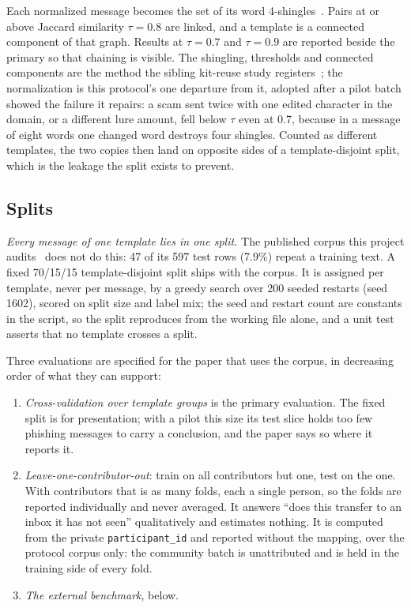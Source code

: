 Each normalized message becomes the set of its word 4-shingles~\cite{broder_sms}. Pairs at or
above Jaccard similarity $\tau = 0.8$ are linked, and a template is a connected component of
that graph. Results at $\tau = 0.7$ and $\tau = 0.9$ are reported beside the primary so that
chaining is visible. The shingling, thresholds and connected components are the method the
sibling kit-reuse study registers~\cite{kitreuse_sms}; the normalization is this protocol's one
departure from it, adopted after a pilot batch showed the failure it repairs: a scam sent twice
with one edited character in the domain, or a different lure amount, fell below $\tau$ even at
0.7, because in a message of eight words one changed word destroys four shingles. Counted as
different templates, the two copies then land on opposite sides of a template-disjoint split,
which is the leakage the split exists to prevent.

\subsection*{Splits}
\emph{Every message of one template lies in one split.} The published corpus this project
audits~\cite{qavn_sms} does not do this: 47 of its 597 test rows (7.9\%) repeat a training
text. A fixed 70/15/15 template-disjoint split ships with the corpus. It is assigned per
template, never per message, by a greedy search over 200 seeded restarts (seed 1602), scored on
split size and label mix; the seed and restart count are constants in the script, so the split
reproduces from the working file alone, and a unit test asserts that no template crosses a
split.

Three evaluations are specified for the paper that uses the corpus, in decreasing order of what
they can support:
\begin{enumerate}[leftmargin=1.6em,itemsep=1pt,topsep=2pt]
  \item \emph{Cross-validation over template groups} is the primary evaluation. The fixed
  split is for presentation; with a pilot this size its test slice holds too few phishing
  messages to carry a conclusion, and the paper says so where it reports it.
  \item \emph{Leave-one-contributor-out}: train on all contributors but one, test on the one.
  With  contributors that is as many folds, each a single person, so the folds are
  reported individually and never averaged. It answers ``does this transfer to an inbox it has
  not seen'' qualitatively and estimates nothing. It is computed from the private
  \texttt{participant\_id} and reported without the mapping, over the protocol corpus only: the
  community batch is unattributed and is held in the training side of every fold.
  \item \emph{The external benchmark}, below.
\end{enumerate}


